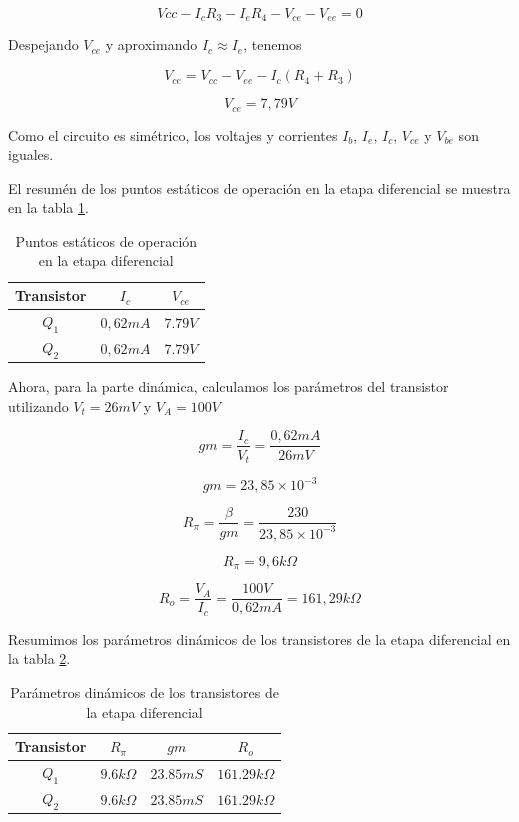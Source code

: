 $$Vcc - I_cR_3 - I_eR_4 - V_{ce} - V_{ee} = 0$$

Despejando $V_{ce}$ y aproximando $I_c \approx I_e$, tenemos 

$$V_{ce} = V_{cc}  - V_{ee} - I_c (R_4 + R_3)$$

$$V_{ce} = 7,79 V$$

Como el circuito es simétrico, los voltajes y corrientes $I_b$, $I_e$, $I_c$, $V_{ce}$ y $V_{be}$ son iguales.

El resumén de los puntos estáticos de operación en la etapa diferencial se muestra en la tabla \ref{tab:amplificador-diferencial-puntos-estaticos}.

\begin{table}[ht]
    \centering
    \begin{tabular}{|c|c|c|}
        \hline
        Transistor & \textbf{$I_c$} & \textbf{$V_{ce}$} \\
        \hline
        $Q_1$ & $0,62 mA$ & $7.79 V$ \\
        $Q_2$ & $0,62 mA$ & $7.79 V$ \\
        \hline
    \end{tabular}
    \caption{Puntos estáticos de operación en la etapa diferencial}
    \label{tab:amplificador-diferencial-puntos-estaticos}
\end{table}

Ahora, para la parte dinámica, calculamos los parámetros del transistor utilizando $V_t = 26 mV$ y $V_A = 100 V$

$$gm = \frac{I_c}{V_t} = \frac{0,62 mA}{26 mV}$$

$$gm = 23,85 \times 10 ^{-3}$$

$$R_\pi = \frac{\beta}{gm} = \frac{230}{23,85\times 10^{-3}}$$

$$ R_\pi = 9,6k \Omega$$

$$ R_o = \frac{V_A}{I_c} = \frac{100 V}{0,62 mA} = 161,29 k\Omega$$

Resumimos los parámetros dinámicos de los transistores de la etapa diferencial en la tabla \ref{tab:met-etapa-diferencial-parametros-dinamicos}.

\begin{table}[ht]
    \centering
    \begin{tabular}{|c|c|c|c|}
        \hline
        Transistor & $R_\pi$ & $gm$ & $R_o$ \\
        \hline
        $Q_1$ & $9.6 k\Omega$ & $23.85mS$ & $161.29k\Omega$ \\
        \hline
        $Q_2$ & $9.6 k\Omega$ & $23.85mS$ & $161.29k\Omega$ \\
        \hline
    \end{tabular}
    \caption{Parámetros dinámicos de los transistores de la etapa diferencial}
    \label{tab:met-etapa-diferencial-parametros-dinamicos}
    \end{table}

